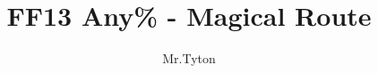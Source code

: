 \documentclass[dvipsnames]{report}
\title{FF13 Any\% - Magical Route}
\author{Mr.Tyton}
\begin{document}
\singlespacing
\maketitle
\tableofcontents

\newcommand{\syn}{\textbf{\textcolor{purple}{SYN}}}
\newcommand{\sab}{\textbf{\textcolor{gray}{SAB}}}
\newcommand{\com}{\textbf{\textcolor{red}{COM}}}
\newcommand{\rav}{\textbf{\textcolor{blue}{RAV}}}
\newcommand{\sen}{\textbf{\textcolor{BurntOrange}{SEN}}}
\newcommand{\med}{\textbf{\textcolor{green}{MED}}}

\newenvironment{battle}[1]{\begin{tcolorbox}[title=\begin{center}#1\end{center},colbacktitle=red!50!white]}{\end{tcolorbox}}

\newenvironment{shop}[1]{\begin{tcolorbox}[title=\begin{center}SHOP\, #1 GIL\end{center},colbacktitle=blue!50!white]}{\end{tcolorbox}}

\newenvironment{upgrade}{\begin{tcolorbox}[title=\begin{center}UPGRADE\end{center},colbacktitle=purple!50!white]}{\end{tcolorbox}}

\newenvironment{menu}{\begin{tcolorbox}[title=\begin{center}MENU\end{center},colbacktitle=black!50!white]}{\end{tcolorbox}}

\newcommand{\first}{1}
\newcommand{\second}{2}
\newcommand{\third}{3}
\newcommand{\fourth}{4}
\newcommand{\fifth}{5}
\newcommand{\sixth}{6}

\newcommand{\paradigm}{\item \textbf{Paradigm}}
\newcommand{\crystarium}{\item \textbf{Crystarium}}
\newcommand{\equip}{\item \textbf{Equipment}}

\newcommand{\stagger}{\textbf{STAGGER}}

\newcommand{\paradigmline}[4][]{#2 & #3 & #4 & \ifthenelse{\equal{#1}{}}{}{$\leftarrow$ \textit{Default}}}
\end{document}
